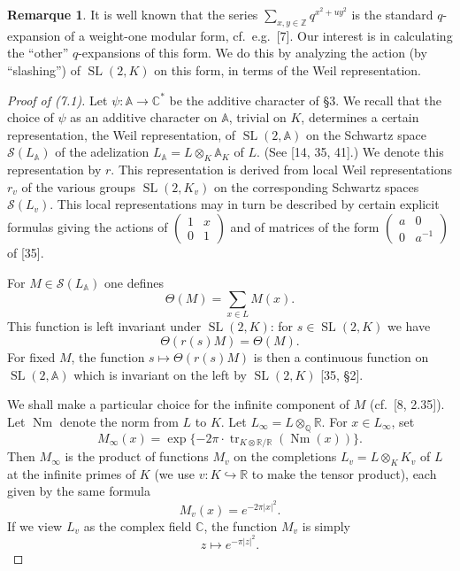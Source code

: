 \documentclass[12pt,a4paper]{article}
\theoremstyle{plain}
\theoremstyle{definition}
\newtheorem{remark}[theorem]{Remarque}
\theoremstyle{remark}
\DeclareMathOperator{\SL}{SL}
\DeclareMathOperator{\tr}{tr}
\DeclareMathOperator{\Nm}{Nm}
\begin{document}
\begin{remark}
It is well known that the series $\sum_{x,y \in \mathbb{Z}} q^{x^2 + u y^2}$ is the standard $q$-expansion of a weight-one modular form, cf.~e.g.~[7]. Our interest is in calculating the ``other'' $q$-expansions of this form. We do this by analyzing the action (by ``slashing'') of $\SL(2,K)$ on this form, in terms of the Weil representation.
\end{remark}

\begin{proof}[Proof of (7.1)]
Let $\psi: \mathbb{A} \to \mathbb{C}^*$ be the additive character of \S3. We recall that the choice of $\psi$ as an additive character on $\mathbb{A}$, trivial on $K$, determines a certain representation, the Weil representation, of $\SL(2, \mathbb{A})$ on the Schwartz space $\mathscr{S}(L_{\mathbb{A}})$ of the adelization $L_{\mathbb{A}} = L \otimes_K \mathbb{A}_K$ of $L$. (See [14, 35, 41].) We denote this representation by $r$. This representation is derived from local Weil representations $r_v$ of the various groups $\SL(2, K_v)$ on the corresponding Schwartz spaces $\mathscr{S}(L_v)$. This local representations may in turn be described by certain explicit formulas giving the actions of $\begin{pmatrix} 1 & x \\ 0 & 1 \end{pmatrix}$ and of matrices of the form $\begin{pmatrix} a & 0 \\ 0 & a^{-1} \end{pmatrix}$ of [35].

For $M \in \mathscr{S}(L_{\mathbb{A}})$ one defines
\[
\Theta(M) = \sum_{x \in L} M(x).
\]
This function is left invariant under $\SL(2,K)$: for $s \in \SL(2,K)$ we have
\[
\Theta(r(s)M) = \Theta(M).
\]
For fixed $M$, the function $s \mapsto \Theta(r(s)M)$ is then a continuous function on $\SL(2, \mathbb{A})$ which is invariant on the left by $\SL(2,K)$ [35, \S2].

We shall make a particular choice for the infinite component of $M$ (cf.~[8, 2.35]). Let $\Nm$ denote the norm from $L$ to $K$. Let $L_\infty = L \otimes_{\mathbb{Q}} \mathbb{R}$. For $x \in L_\infty$, set
\[
M_\infty(x) = \exp\{-2\pi \cdot \tr_{K \otimes \mathbb{R}/\mathbb{R}}(\Nm(x))\}.
\]
Then $M_\infty$ is the product of functions $M_v$ on the completions $L_v = L \otimes_K K_v$ of $L$ at the infinite primes of $K$ (we use $v: K \hookrightarrow \mathbb{R}$ to make the tensor product), each given by the same formula
\[
M_v(x) = e^{-2\pi |x|^2}.
\]
If we view $L_v$ as the complex field $\mathbb{C}$, the function $M_v$ is simply
\[
z \mapsto e^{-\pi |z|^2}.
\]


\end{proof}
\end{document}

